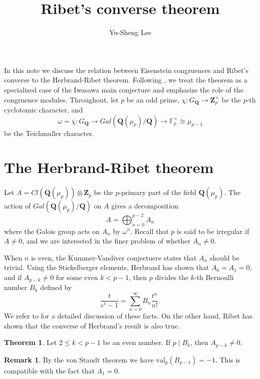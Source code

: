 \documentclass[11pt]{amsart}
\title{Ribet's converse theorem}
\author{Yu-Sheng Lee}
\newcommand{\Q}{\mathbf{Q}}  %
\newcommand{\Z}{\mathbf{Z}}  %
\theoremstyle{definition}
\theoremstyle{definition}
\newtheorem{theorem}[definition]{Theorem}
\theoremstyle{definition}
\theoremstyle{definition}
\newtheorem{remark}[definition]{Remark}
\theoremstyle{definition}
\theoremstyle{definition}
\begin{document}
\maketitle


In this note we discuss 
the relation between Eisenstein congruences and Ribet's converse 
to the Herbrand-Ribet theorem.
Following \cite{Sk}, we treat the theorem
as a specialized case of the Iwasawa main conjecture
and emphasize the role of the congruence modules.
Throughout, let $p$ be an odd prime,
$\chi\colon G_\Q\to\Z_p^\times$ be the $p$-th cyclotomic character, 
and 
\begin{equation*}
    \omega=\overline{\chi}\colon G_\Q
    \to Gal(\Q(\mu_p)/\Q)\to
    \mathbb{F}_p^\times \cong \mu_{p-1}
\end{equation*}
be the Teichmuller character.


\section{The Herbrand-Ribet theorem}

Let $A=Cl(\Q(\mu_p))\otimes\Z_p$ be the $p$-primary part of the field $\Q(\mu_p)$. The action 
of $Gal(\Q(\mu_p)/\Q)$ on $A$ gives a decomposition
\begin{equation*}
    A=\bigoplus_{n=0}^{p-2}A_n
\end{equation*}
where the Galois group acts on $A_n$ by $\omega^n$.
Recall that $p$ is said to be irregular if $A\neq 0$,
and we are interested in the finer problem of whether $A_n\neq 0$.

When $n$ is even,
the Kummer-Vandiver conjectuere states that $A_n$ should be trivial.
Using the Stickelberger elements, Herbrand has shown that $A_0=A_1=0$, and
if $A_{p-k}\neq 0$ for some even $k<p-1$, then $p$ divides the $k$-th Bernoulli number $B_k$
defined by
\begin{equation*}
    \frac{t}{e^t-1}=\sum_{n=0}^\infty B_n\frac{t^n}{n!}.
\end{equation*}
We refer to \cite{Wa} for a detailed discussion of these facts.
On the other hand, Ribet has shown that the converse of Herbrand's result is also true.
\begin{theorem}\cite{Ri}
    Let $2\leq k< p-1$ be an even number. If $p\mid B_k$, then
    $A_{p-k}\neq 0$.
\end{theorem}
\begin{remark}
   By the von Staudt theorem we have $\text{val}_p(B_{p-1})=-1$. This is compatible with the fact that $A_1=0$.
\end{remark}
\end{document}
